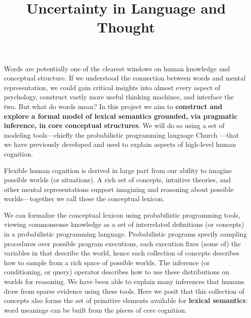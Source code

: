 \documentclass[12pt]{article}
\title{Uncertainty in Language and Thought}
\newcounter{definition}
\begin{document}


\maketitle

\abstract{}


\pagebreak

\tableofcontents

\pagebreak



Words are potentially one of the clearest windows on human knowledge and conceptual structure. If we understood the connection between words and mental representation, we could gain critical insights into almost every aspect of psychology, construct vastly more useful thinking machines, and interface the two. But what do words mean? In this project we aim to {\bf construct and explore a formal model of lexical semantics grounded, via pragmatic inference, in core conceptual structures}. We will do so using a set of modeling tools---chiefly the probabilistic programming language Church \cite{goodman2008}---that we have previously developed and used to explain  aspects of high-level human cognition.

Flexible human cognition is derived in large part from our ability to imagine possible worlds (or situations). A rich set of concepts, intuitive theories, and other mental representations support imagining and reasoning about possible worlds---together we call these the conceptual lexicon. 

We can formalize the conceptual lexicon using probabilistic programming tools, viewing commonsense knowledge as a set of interrelated definitions (or concepts) in a probabilistic programming language. Probabilistic programs specify sampling procedures over possible program executions, each execution fixes (some of) the variables in that describe the world, hence each collection of concepts describes how to sample from a rich space of possible worlds. The inference (or conditioning, or query) operator describes how to use these distributions on worlds for reasoning.
We have been able to explain many inferences that humans draw from sparse evidence using these tools. Here we posit that this collection of concepts also forms the set of primitive elements available for {\bf lexical semantics}: word meanings can be built from the pieces of core cognition.
\end{document}
